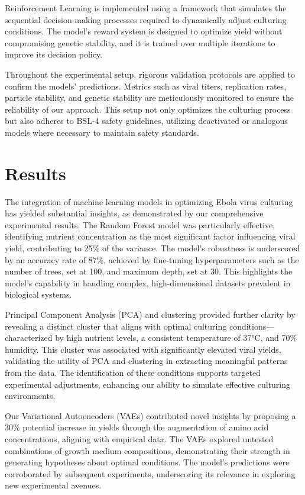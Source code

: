 \documentclass{article}
\begin{document}
Reinforcement Learning is implemented using a framework that simulates the sequential decision-making processes required to dynamically adjust culturing conditions. The model's reward system is designed to optimize yield without compromising genetic stability, and it is trained over multiple iterations to improve its decision policy.

Throughout the experimental setup, rigorous validation protocols are applied to confirm the models' predictions. Metrics such as viral titers, replication rates, particle stability, and genetic stability are meticulously monitored to ensure the reliability of our approach. This setup not only optimizes the culturing process but also adheres to BSL-4 safety guidelines, utilizing deactivated or analogous models where necessary to maintain safety standards.

\section{Results}
The integration of machine learning models in optimizing Ebola virus culturing has yielded substantial insights, as demonstrated by our comprehensive experimental results. The Random Forest model was particularly effective, identifying nutrient concentration as the most significant factor influencing viral yield, contributing to 25\% of the variance. The model's robustness is underscored by an accuracy rate of 87\%, achieved by fine-tuning hyperparameters such as the number of trees, set at 100, and maximum depth, set at 30. This highlights the model's capability in handling complex, high-dimensional datasets prevalent in biological systems.

Principal Component Analysis (PCA) and clustering provided further clarity by revealing a distinct cluster that aligns with optimal culturing conditions—characterized by high nutrient levels, a consistent temperature of 37°C, and 70\% humidity. This cluster was associated with significantly elevated viral yields, validating the utility of PCA and clustering in extracting meaningful patterns from the data. The identification of these conditions supports targeted experimental adjustments, enhancing our ability to simulate effective culturing environments.

Our Variational Autoencoders (VAEs) contributed novel insights by proposing a 30\% potential increase in yields through the augmentation of amino acid concentrations, aligning with empirical data. The VAEs explored untested combinations of growth medium compositions, demonstrating their strength in generating hypotheses about optimal conditions. The model's predictions were corroborated by subsequent experiments, underscoring its relevance in exploring new experimental avenues.
\end{document}
